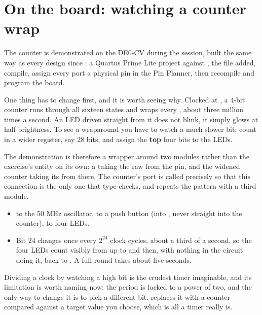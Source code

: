\section{On the board: watching a counter wrap}
\label{c6:sec:counterdemo}

The counter is demonstrated on the DE0-CV during the session, built the same way as every design
since : a Quartus Prime Lite project against , the 
file added, compile, assign every port a physical pin in the Pin Planner, then recompile and program
the board.

One thing has to change first, and it is worth seeing why. Clocked at , a 4-bit counter
runs through all sixteen states and wraps every , about three million times a second. An
LED driven straight from it does not blink, it simply glows at half brightness. To see a wraparound
you have to watch a much slower bit: count in a wider register, say 28 bits, and assign the
\textbf{top} four bits to the LEDs.

The demonstration is therefore a wrapper around two modules rather than the exercise's entity on its
own: a  taking the raw  from the pin, and the widened counter taking
its  from there. The counter's port is called  precisely so that
this connection is the only one that type-checks, and  repeats the pattern
with a third module.

\begin{itemize}
  \item {} to the 50 MHz oscillator,  to a push button (into
    , never straight into the counter),  to four LEDs.
  \item Bit 24 changes once every $2^{24}$ clock cycles, about a third of a second, so the four LEDs
    count visibly from  up to  and then, with nothing in the circuit doing it,
    back to . A full round takes about five seconds.
\end{itemize}

Dividing a clock by watching a high bit is the crudest timer imaginable, and its limitation is worth
naming now: the period is locked to a power of two, and the only way to change it is to pick a
different bit.  replaces it with a counter compared against a target value you
choose, which is all a timer really is.

